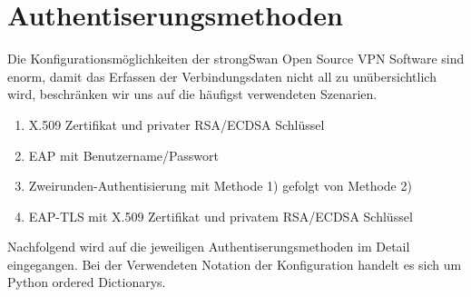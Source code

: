 \section{Authentiserungsmethoden}
Die Konfigurationsmöglichkeiten der strongSwan Open Source VPN Software sind enorm, damit das Erfassen der Verbindungsdaten nicht all zu unübersichtlich wird, beschränken wir uns auf die häufigst verwendeten Szenarien.

\begin{enumerate}
	\item X.509 Zertifikat und privater RSA/ECDSA Schlüssel
	\item EAP mit Benutzername/Passwort
	\item Zweirunden-Authentisierung mit Methode 1) gefolgt von Methode 2)
	\item EAP-TLS mit X.509 Zertifikat und privatem RSA/ECDSA Schlüssel
\end{enumerate}

Nachfolgend wird auf die jeweiligen Authentiserungsmethoden im Detail eingegangen. Bei der Verwendeten Notation der Konfiguration handelt es sich um Python ordered Dictionarys.

